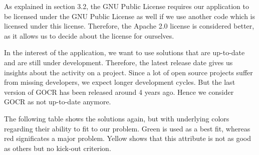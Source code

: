 As explained in section 3.2, the GNU Public License requires our application to be licensed under the GNU Public License as well if we use another code which is licensed under this license. Therefore, the Apache 2.0 license is considered better, as it allows us to decide about the license for ourselves.

In the interest of the application, we want to use solutions that are up-to-date and are still under development. Therefore, the latest release date gives us insights about the activity on a project. Since a lot of open source projects suffer from missing developers, we expect longer development cycles. But the last version of GOCR has been released around 4 years ago. Hence we consider GOCR as not up-to-date anymore.

The following table shows the solutions again, but with underlying colors regarding their ability to fit to our problem. Green is used as a best fit, whereas red significates a major problem. Yellow shows that this attribute is not as good as others but no kick-out criterion. 

